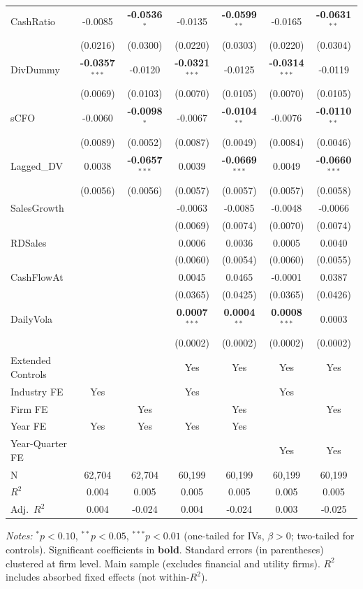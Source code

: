\documentclass[11pt,a4paper]{article}
\begin{document}
\begin{table}[htbp]
\begin{tabular}{lcccccc}
CashRatio & -0.0085 & \textbf{-0.0536}$^{*}$ & -0.0135 & \textbf{-0.0599}$^{**}$ & -0.0165 & \textbf{-0.0631}$^{**}$ \\
 & (0.0216) & (0.0300) & (0.0220) & (0.0303) & (0.0220) & (0.0304) \\
DivDummy & \textbf{-0.0357}$^{***}$ & -0.0120 & \textbf{-0.0321}$^{***}$ & -0.0125 & \textbf{-0.0314}$^{***}$ & -0.0119 \\
 & (0.0069) & (0.0103) & (0.0070) & (0.0105) & (0.0070) & (0.0105) \\
sCFO & -0.0060 & \textbf{-0.0098}$^{*}$ & -0.0067 & \textbf{-0.0104}$^{**}$ & -0.0076 & \textbf{-0.0110}$^{**}$ \\
 & (0.0089) & (0.0052) & (0.0087) & (0.0049) & (0.0084) & (0.0046) \\
Lagged\_DV & 0.0038 & \textbf{-0.0657}$^{***}$ & 0.0039 & \textbf{-0.0669}$^{***}$ & 0.0049 & \textbf{-0.0660}$^{***}$ \\
 & (0.0056) & (0.0056) & (0.0057) & (0.0057) & (0.0057) & (0.0058) \\
SalesGrowth &  &  & -0.0063 & -0.0085 & -0.0048 & -0.0066 \\
 &  &  & (0.0069) & (0.0074) & (0.0070) & (0.0074) \\
RDSales &  &  & 0.0006 & 0.0036 & 0.0005 & 0.0040 \\
 &  &  & (0.0060) & (0.0054) & (0.0060) & (0.0055) \\
CashFlowAt &  &  & 0.0045 & 0.0465 & -0.0001 & 0.0387 \\
 &  &  & (0.0365) & (0.0425) & (0.0365) & (0.0426) \\
DailyVola &  &  & \textbf{0.0007}$^{***}$ & \textbf{0.0004}$^{**}$ & \textbf{0.0008}$^{***}$ & 0.0003 \\
 &  &  & (0.0002) & (0.0002) & (0.0002) & (0.0002) \\
\midrule
Extended Controls &  &  & Yes & Yes & Yes & Yes \\
Industry FE & Yes &  & Yes &  & Yes &  \\
Firm FE &  & Yes &  & Yes &  & Yes \\
Year FE & Yes & Yes & Yes & Yes &  &  \\
Year-Quarter FE &  &  &  &  & Yes & Yes \\
\midrule
N & 62,704 & 62,704 & 60,199 & 60,199 & 60,199 & 60,199 \\
$R^2$ & 0.004 & 0.005 & 0.005 & 0.005 & 0.005 & 0.005 \\
Adj.~$R^2$ & 0.004 & -0.024 & 0.004 & -0.024 & 0.003 & -0.025 \\
\bottomrule
\end{tabular}
\begin{minipage}{\linewidth}
\vspace{2pt}\scriptsize
\textit{Notes:} $^{*}p<0.10$, $^{**}p<0.05$, $^{***}p<0.01$ (one-tailed for IVs, $\beta > 0$; two-tailed for controls).
 Significant coefficients in \textbf{bold}.
 Standard errors (in parentheses) clustered at firm level.
 Main sample (excludes financial and utility firms).
 $R^2$ includes absorbed fixed effects (not within-$R^2$).
\end{minipage}
\end{table}
\end{document}

